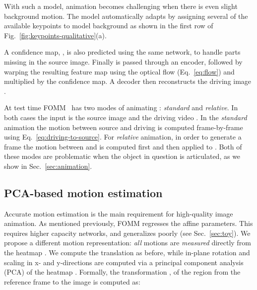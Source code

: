 \documentclass[final]{cvpr}
\begin{document}
With such a model, animation becomes challenging when there is even slight background motion. The model automatically adapts by assigning several of the available keypoints to model background as shown in the first row of Fig.~\ref{fig:keypoints-qualitative}(a). 

A confidence map, , is also predicted using the same network, to handle parts missing in the source image. Finally  is passed through an encoder, followed by warping the resulting feature map using the optical flow (Eq.~\ref{eq:flow}) and multiplied by the confidence map. A decoder then reconstructs the driving image .

At test time FOMM~\cite{fomm} has two modes of animating : \emph{standard} and \emph{relative}. In both cases the input is the source image  and the driving video . In the \emph{standard} animation the motion between source and driving is computed frame-by-frame using Eq.~\eqref{eq:driving-to-source}.
For \emph{relative} animation, in order to generate a frame  the motion between  and  is computed first and then applied to . Both of these modes are problematic when the object in question is articulated, as we show in Sec.~\ref{sec:animation}.



\vspace{-0.2cm}
\subsection{PCA-based motion estimation}
\label{sec:regions}
\vspace{-0.2cm}
Accurate motion estimation is the main requirement for high-quality image animation. As mentioned previously, FOMM regresses the affine parameters. This requires higher capacity networks, and generalizes poorly (see Sec.~\ref{sec:toy}). We propose a different motion representation: \emph{all} motions are \emph{measured} directly from the heatmap . We compute the translation as before, while in-plane rotation and scaling in x- and y-directions are computed via a principal component analysis (PCA) of the heatmap . Formally, the transformation , of the  region from the reference frame to the image is computed as:
\end{document}
